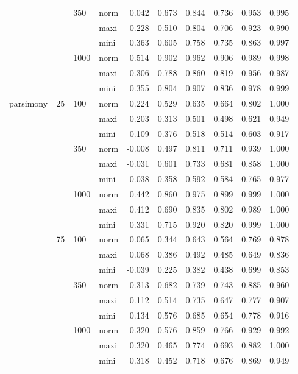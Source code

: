 \begin{longtable}{llllrrrrrr}
   &  & 350 & norm & 0.042 & 0.673 & 0.844 & 0.736 & 0.953 & 0.995 \\ 
   &  &  & maxi & 0.228 & 0.510 & 0.804 & 0.706 & 0.923 & 0.990 \\ 
   &  &  & mini & 0.363 & 0.605 & 0.758 & 0.735 & 0.863 & 0.997 \\ 
   &  & 1000 & norm & 0.514 & 0.902 & 0.962 & 0.906 & 0.989 & 0.998 \\ 
   &  &  & maxi & 0.306 & 0.788 & 0.860 & 0.819 & 0.956 & 0.987 \\ 
   &  &  & mini & 0.355 & 0.804 & 0.907 & 0.836 & 0.978 & 0.999 \\ 
  parsimony & 25 & 100 & norm & 0.224 & 0.529 & 0.635 & 0.664 & 0.802 & 1.000 \\ 
   &  &  & maxi & 0.203 & 0.313 & 0.501 & 0.498 & 0.621 & 0.949 \\ 
   &  &  & mini & 0.109 & 0.376 & 0.518 & 0.514 & 0.603 & 0.917 \\ 
   &  & 350 & norm & -0.008 & 0.497 & 0.811 & 0.711 & 0.939 & 1.000 \\ 
   &  &  & maxi & -0.031 & 0.601 & 0.733 & 0.681 & 0.858 & 1.000 \\ 
   &  &  & mini & 0.038 & 0.358 & 0.592 & 0.584 & 0.765 & 0.977 \\ 
   &  & 1000 & norm & 0.442 & 0.860 & 0.975 & 0.899 & 0.999 & 1.000 \\ 
   &  &  & maxi & 0.412 & 0.690 & 0.835 & 0.802 & 0.989 & 1.000 \\ 
   &  &  & mini & 0.331 & 0.715 & 0.920 & 0.820 & 0.999 & 1.000 \\ 
   & 75 & 100 & norm & 0.065 & 0.344 & 0.643 & 0.564 & 0.769 & 0.878 \\ 
   &  &  & maxi & 0.068 & 0.386 & 0.492 & 0.485 & 0.649 & 0.836 \\ 
   &  &  & mini & -0.039 & 0.225 & 0.382 & 0.438 & 0.699 & 0.853 \\ 
   &  & 350 & norm & 0.313 & 0.682 & 0.739 & 0.743 & 0.885 & 0.960 \\ 
   &  &  & maxi & 0.112 & 0.514 & 0.735 & 0.647 & 0.777 & 0.907 \\ 
   &  &  & mini & 0.134 & 0.576 & 0.685 & 0.654 & 0.778 & 0.916 \\ 
   &  & 1000 & norm & 0.320 & 0.576 & 0.859 & 0.766 & 0.929 & 0.992 \\ 
   &  &  & maxi & 0.320 & 0.465 & 0.774 & 0.693 & 0.882 & 1.000 \\ 
   &  &  & mini & 0.318 & 0.452 & 0.718 & 0.676 & 0.869 & 0.949 \\ 

\end{longtable}

